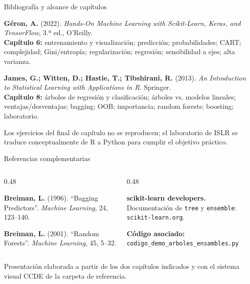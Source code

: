 \documentclass[aspectratio=169,11pt,table]{beamer}
\begin{document}
\begin{frame}{Bibliografía y alcance de capítulos}
\small
\begin{ccdebox}
\textbf{Géron, A.} (2022). \emph{Hands-On Machine Learning with Scikit-Learn, Keras, and TensorFlow}, 3.ª ed., O'Reilly.\\
\textbf{Capítulo 6:} entrenamiento y visualización; predicción; probabilidades; CART; complejidad; Gini/entropía; regularización; regresión; sensibilidad a ejes; alta varianza.
\end{ccdebox}
\vspace{0.12cm}
\begin{ccdebox}
\textbf{James, G.; Witten, D.; Hastie, T.; Tibshirani, R.} (2013). \emph{An Introduction to Statistical Learning with Applications in R}. Springer.\\
\textbf{Capítulo 8:} árboles de regresión y clasificación; árboles vs. modelos lineales; ventajas/desventajas; bagging; OOB; importancia; random forests; boosting; laboratorio.
\end{ccdebox}
\vspace{0.12cm}
\begin{keybox}
Los ejercicios del final de capítulo no se reproducen; el laboratorio de ISLR se traduce conceptualmente de R a Python para cumplir el objetivo práctico.
\end{keybox}
\end{frame}

\begin{frame}{Referencias complementarias}
\small
\begin{columns}[T,onlytextwidth]
\begin{column}{0.48\textwidth}
\begin{ccdebox}
\textbf{Breiman, L.} (1996). ``Bagging Predictors''. \emph{Machine Learning}, 24, 123--140.
\end{ccdebox}
\vspace{0.18cm}
\begin{ccdebox}
\textbf{Breiman, L.} (2001). ``Random Forests''. \emph{Machine Learning}, 45, 5--32.
\end{ccdebox}
\end{column}
\begin{column}{0.48\textwidth}
\begin{ccdebox}
\textbf{scikit-learn developers.} Documentación de \texttt{tree} y \texttt{ensemble}: \texttt{scikit-learn.org}.
\end{ccdebox}
\vspace{0.18cm}
\begin{ccdebox}
\textbf{Código asociado:}\\
\texttt{codigo\_demo\_arboles\_ensambles.py}
\end{ccdebox}
\end{column}
\end{columns}
\vfill
\begin{keybox}
\centering
Presentación elaborada a partir de los dos capítulos indicados y con el sistema visual CCDE de la carpeta de referencia.
\end{keybox}
\end{frame}
\end{document}

